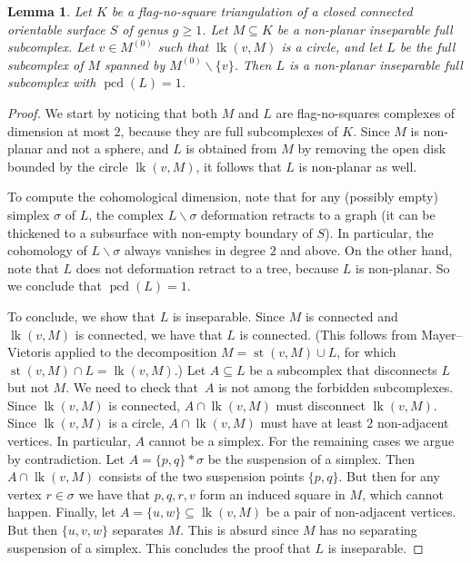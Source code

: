 \documentclass{amsart}
\theoremstyle{plain}
\newtheorem{lemma}[theorem]{Lemma}
\theoremstyle{definition}
\theoremstyle{remark}
\numberwithin{equation}{section}
\newcommand{\lk}[2]{\operatorname{lk}(#1,#2)} %
\newcommand{\st}[2]{\operatorname{st}(#1,#2)} %
\newcommand{\pcd}{\operatorname{pcd}}
\renewcommand{\geq}{\geqslant}
\renewcommand{\setminus}{\smallsetminus}
\begin{document}
\begin{lemma}\label{lem:menger_vertex}
    Let ${K}$ be a flag-no-square triangulation  of a  closed connected orientable surface $S$ of genus $g\geq 1$.
    Let $M \subseteq {K}$ be a non-planar inseparable full subcomplex. 
    Let $v \in M^{(0)}$ such that $\lk{v}{M}$ is a circle,
    and let $L$ be the full subcomplex of $M$ spanned by $M^{(0)}\setminus \{v\}$.
    Then $L$ is a non-planar inseparable full subcomplex with $\pcd (L)=1$.
\end{lemma}
\begin{proof}
We start by noticing that both $M$ and $L$ are   flag-no-squares   complexes of dimension at most $2$, because they are full subcomplexes of $ K$. 
Since $M$ is non-planar and not a sphere, and $L$ is obtained from $M$ by removing the open disk bounded by the circle $\lk vM$, it follows that $L$ is non-planar as well.
 
To compute the cohomological dimension, note that for any (possibly empty) simplex $\sigma$ of $L$, the complex $L\setminus \sigma$ deformation retracts to a graph (it can be thickened to a subsurface with non-empty boundary of $S$).
In particular, the cohomology of $L\setminus \sigma$ always vanishes in degree $2$ and above.
On the other hand, note that $L$ does not deformation retract to a tree, because $L$ is non-planar. So we conclude that $\pcd(L)=1$.

To conclude, we show that $L$ is inseparable. 
Since $M$ is connected and $\lk vM$ is connected, we have that $L$ is connected. 
(This follows from Mayer--Vietoris applied to the decomposition  $M=\st vM \cup L$, for which $\st vM\cap L=\lk vM$.)  
Let $A\subseteq L$ be a subcomplex that disconnects $L$ but not $M$.
We need to check that~$A$ is not among the forbidden subcomplexes.
Since $\lk vM$ is connected, $A\cap \lk vM$ must disconnect $\lk vM$.
Since $\lk vM$ is a circle, $A\cap \lk vM$ must have at least $2$ non-adjacent vertices.
In particular, $A$ cannot be a simplex.
For the remaining cases we argue by contradiction.
Let $A=\{p,q\}\ast \sigma$ be the suspension of a simplex. Then $A\cap \lk vM$  consists of the two suspension points $\{p,q\}$. 
But then for any vertex $r\in \sigma$ we have that $p,q,r,v$ form an induced square in $M$, which cannot happen.
 Finally, let $A=\{u,w\}\subseteq \lk vM$ be a pair of non-adjacent vertices. 
 But then $\{u,v,w\}$ separates $M$.
 This is absurd since $M$ has no separating suspension of a simplex.
 This concludes the proof that $L$ is inseparable. 
\end{proof}
\end{document}
